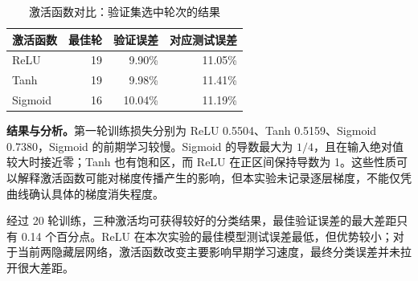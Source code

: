 \documentclass[UTF8,11pt,a4paper,fontset=fandol]{ctexart}
\begin{document}
\begin{table}[H]\centering\small
\caption{激活函数对比：验证集选中轮次的结果}
\begin{tabular}{lrrr}\toprule
激活函数 & 最佳轮 & 验证误差 & 对应测试误差 \\\midrule
ReLU & 19 & 9.90\% & 11.05\% \\
Tanh & 19 & 9.98\% & 11.41\% \\
Sigmoid & 16 & 10.04\% & 11.19\% \\

\bottomrule\end{tabular}
\end{table}
\textbf{结果与分析。}第一轮训练损失分别为 ReLU 0.5504、Tanh 0.5159、Sigmoid 0.7380，Sigmoid 的前期学习较慢。Sigmoid 的导数最大为 $1/4$，且在输入绝对值较大时接近零；Tanh 也有饱和区，而 ReLU 在正区间保持导数为 1。这些性质可以解释激活函数可能对梯度传播产生的影响，但本实验未记录逐层梯度，不能仅凭曲线确认具体的梯度消失程度。

经过 20 轮训练，三种激活均可获得较好的分类结果，最佳验证误差的最大差距只有 0.14 个百分点。ReLU 在本次实验的最佳模型测试误差最低，但优势较小；对于当前两隐藏层网络，激活函数改变主要影响早期学习速度，最终分类误差并未拉开很大差距。
\end{document}
